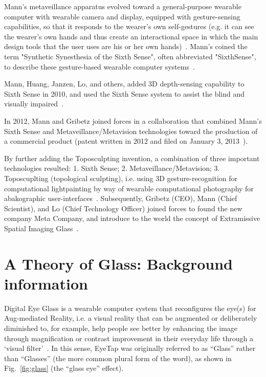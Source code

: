 Mann's metaveillance apparatus evolved toward a general-purpose wearable computer with wearable camera and display, equipped with gesture-sensing capabilities, so that it responds to the wearer's own self-gestures (e.g. it can see the wearer's own hands and thus create an interactional space in which the main design tools that the user uses are his or her own hands)~\cite{mannieeecomputer}. Mann's coined the term "Synthetic Synesthesia of the Sixth Sense", often abbreviated "SixthSense", to describe these gesture-based wearable computer systems~\cite{cyborg, geary2002body}.

Mann, Huang, Janzen, Lo, and others, added 3D depth-sensing capability to Sixth Sense in 2010, and used the Sixth Sense system to assist the blind and visually impaired~\cite{mann2011blind}.

In 2012, Mann and Gribetz joined forces in a collaboration that combined Mann's Sixth Sense and Metaveillance/Metavision technologies toward the production of a commercial product (patent written in 2012 and filed on January 3, 2013~\cite{patentmetadepth}).

By further adding the Toposculpting invention, a combination of three important technologies resulted:
1. Sixth Sense;
2. Metaveillance/Metavision;
3. Toposcuplting (topological sculpting), i.e. using 3D gesture-recognition for computational lightpainting by way of wearable computational photography for abakographic user-interfaces~\cite{patentmetabakography}. Subsequently, Gribetz (CEO), Mann (Chief Scientist), and Lo (Chief Technology Officer) joined forces to found the new company Meta Company, and introduce to the world the concept of Extramissive Spatial Imaging Glass~\cite{gribetz2014extramissive}. 

\section{A Theory of Glass: Background information}

Digital Eye Glass is a wearable computer system that reconfigures the eye(s)
for Aug-mediated Reality, i.e. a visual reality that can be augmented or
deliberately diminished to, for example, help people see better by enhancing the image through 
magnification or contrast improvement in their everyday life through a `visual 
filter'~\cite{mann1994mediated}. 
In this sense, EyeTap was originally referred to as ``Glass'' rather than ``Glasses'' (the more common plural 
form of the word), as shown in Fig.~\ref{fig:glass} (the ``glass eye'' effect). 

